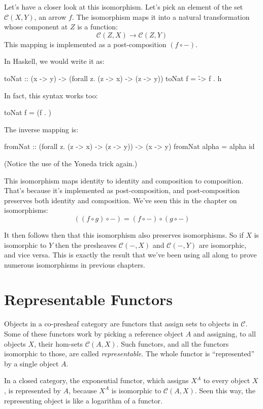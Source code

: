 \documentclass[DaoFP]{subfiles}
\begin{document}
Let's have a closer look at this isomorphism. Let's pick an element of the set $\mathcal{C}(X, Y)$, an arrow $f$. The isomorphism maps it into a natural transformation whose component at $Z$ is a function:
\[ \mathcal{C}(Z, X) \to \mathcal{C}(Z, Y) \]
This mapping is implemented as a post-composition $(f \circ -)$.

In Haskell, we would write it as:
\begin{haskell}
toNat :: (x -> y) -> (forall z. (z -> x) -> (z -> y))
toNat f = \h -> f . h 
\end{haskell}
In fact, this syntax works too:
\begin{haskell}
toNat f = (f . )
\end{haskell}
The inverse mapping is:
\begin{haskell}
fromNat :: (forall z. (z -> x) -> (z -> y)) -> (x -> y)
fromNat alpha = alpha id
\end{haskell}
(Notice the use of the Yoneda trick again.)

This isomorphism maps identity to identity and composition to composition. That's because it's implemented as post-composition, and post-composition preserves both identity and composition. We've seen this in the chapter on isomorphisms:
\[ ((f \circ g) \circ -) = (f \circ -) \circ (g \circ -) \]

It then follows then that this isomorphism also preserves isomorphisms. So if $X$ is isomorphic to $Y$ then the presheaves $ \mathcal{C}(-, X)$ and $ \mathcal{C}(-, Y)$ are isomorphic, and vice versa. This is exactly the result that we've been using all along to prove numerous isomorphisms in previous chapters. 

\section{Representable Functors}

Objects in a  co-presheaf category are functors that assign sets to objects in $\mathcal{C}$. Some of these functors work by picking a reference object $A$ and assigning,  to all objects $X$, their hom-sets  $\mathcal{C}(A, X)$. Such functors, and all the functors isomorphic to those, are called \emph{representable}. The whole functor is ``represented'' by a single object $A$. 

In a closed category, the exponential functor, which assigns $X^A$ to every object $X$, is represented by $A$, because $X^A$ is isomorphic to $\mathcal{C}(A, X)$. Seen this way, the representing object is like a logarithm of a functor. 
\end{document}

